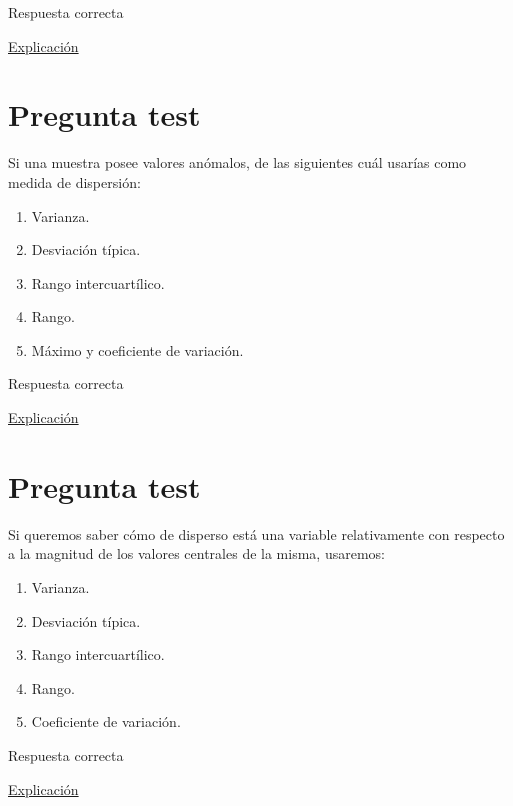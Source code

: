 \documentclass[
]{book}
\providecommand{\tightlist}{%
  \setlength{\itemsep}{0pt}\setlength{\parskip}{0pt}}
\begin{document}
Respuesta correcta

\href{https://1fjmanzano.github.io/bioestadistica/medidas-de-posicio\%CC\%81n-dispersio\%CC\%81n-y-forma.html\#medidas-de-posicio\%CC\%81n-centrales}{Explicación}

\hypertarget{pregunta-test-73}{%
\section{Pregunta test}\label{pregunta-test-73}}

Si una muestra posee valores anómalos, de las siguientes cuál usarías como medida de dispersión:

\begin{enumerate}
\def\labelenumi{\alph{enumi})}
\tightlist
\item
  Varianza.
\item
  Desviación típica.
\item
  Rango intercuartílico.
\item
  Rango.
\item
  Máximo y coeficiente de variación.
\end{enumerate}

Respuesta correcta

\href{https://1fjmanzano.github.io/bioestadistica/medidas-de-posicio\%CC\%81n-dispersio\%CC\%81n-y-forma.html\#medidas-de-dispersio\%CC\%81n}{Explicación}

\hypertarget{pregunta-test-74}{%
\section{Pregunta test}\label{pregunta-test-74}}

Si queremos saber cómo de disperso está una variable relativamente con respecto a la magnitud de los valores centrales de la misma, usaremos:

\begin{enumerate}
\def\labelenumi{\alph{enumi})}
\tightlist
\item
  Varianza.
\item
  Desviación típica.
\item
  Rango intercuartílico.
\item
  Rango.
\item
  Coeficiente de variación.
\end{enumerate}

Respuesta correcta

\href{https://en.wikipedia.org/wiki/Coefficient_of_variation}{Explicación}
\end{document}
